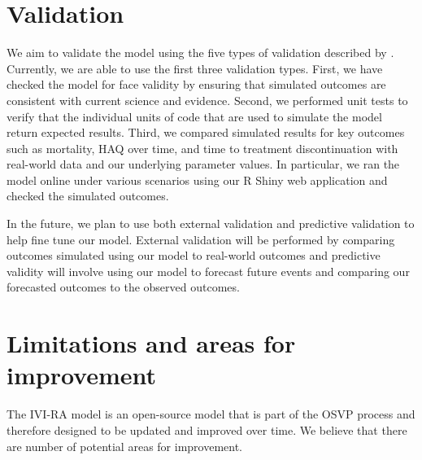 \documentclass[11pt,final,fleqn]{article}\usepackage[]{graphicx}\usepackage[]{color}
\theoremstyle{plain}
\begin{document}
\section{Validation}\label{sec:validation}
We aim to validate the model using the five types of validation described by \citet{eddy2012model}. Currently, we are able to use the first three validation types. First, we have checked the model for face validity by ensuring that simulated outcomes are consistent with current science and evidence. Second, we performed unit tests to verify that the individual units of code that are used to simulate the model return expected results. Third, we compared simulated results for key outcomes such as mortality, HAQ over time, and time to treatment discontinuation with real-world data and our underlying parameter values. In particular, we ran the model online under various scenarios using our R Shiny web application and checked the simulated outcomes. 

In the future, we plan to use both external validation and predictive validation to help fine tune our model. External validation will be performed by comparing outcomes simulated using our model to real-world outcomes and predictive validity will involve using our model to forecast future events and comparing our forecasted outcomes to the observed outcomes. 

\section{Limitations and areas for improvement}\label{sec:limitations}
The IVI-RA model is an open-source model that is part of the OSVP process and therefore designed to be updated and improved over time. We believe that there are number of potential areas for improvement.
\end{document}
